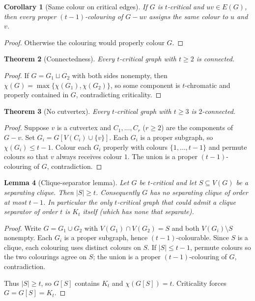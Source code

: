 \documentclass[11pt]{article}
\newtheorem{theorem}{Theorem}[section]
\newtheorem{lemma}[theorem]{Lemma}
\newtheorem{corollary}[theorem]{Corollary}
\theoremstyle{definition}
\begin{document}
\begin{corollary}[Same colour on critical edges]\label{cor:same-col}
If \(G\) is \(t\)-critical and \(uv\in E(G)\), then every proper
\((t-1)\)-colouring of \(G-uv\) assigns the same colour to \(u\) and \(v\).
\end{corollary}

\begin{proof}
Otherwise the colouring would properly colour \(G\).
\end{proof}

\begin{theorem}[Connectedness]\label{thm:conn}
Every \(t\)-critical graph with \(t\ge 2\) is connected.
\end{theorem}

\begin{proof}
If \(G=G_1\sqcup G_2\) with both sides nonempty, then
\(\chi(G)=\max\{\chi(G_1),\chi(G_2)\}\), so some component is \(t\)-chromatic and
properly contained in \(G\), contradicting criticality.
\end{proof}

\begin{theorem}[No cutvertex]\label{thm:2conn}
Every \(t\)-critical graph with \(t\ge 3\) is \(2\)-connected.
\end{theorem}

\begin{proof}
Suppose \(v\) is a cutvertex and \(C_1,\dots,C_r\) (\(r\ge 2\)) are the
components of \(G-v\). Set \(G_i=G[V(C_i)\cup\{v\}]\). Each \(G_i\) is a proper
subgraph, so \(\chi(G_i)\le t-1\). Colour each \(G_i\) properly with colours
\(\{1,\dots,t-1\}\) and permute colours so that \(v\) always receives colour
\(1\). The union is a proper \((t-1)\)-colouring of \(G\), contradiction.
\end{proof}

\begin{lemma}[Clique-separator lemma]\label{lem:clique-sep}
Let \(G\) be \(t\)-critical and let \(S\subseteq V(G)\) be a separating clique.
Then \(|S|\ge t\). Consequently \(G\) has no separating clique of order at most
\(t-1\). In particular the only \(t\)-critical graph that could admit a clique
separator of order \(t\) is \(K_t\) itself (which has none that separate).
\end{lemma}

\begin{proof}
Write \(G=G_1\cup G_2\) with \(V(G_1)\cap V(G_2)=S\) and both
\(V(G_i)\setminus S\) nonempty. Each \(G_i\) is a proper subgraph, hence
\((t-1)\)-colourable. Since \(S\) is a clique, each colouring uses distinct
colours on \(S\). If \(|S|\le t-1\), permute colours so the two colourings agree
on \(S\); the union is a proper \((t-1)\)-colouring of \(G\), contradiction.

Thus \(|S|\ge t\), so \(G[S]\) contains \(K_t\) and \(\chi(G[S])=t\). Criticality
forces \(G=G[S]=K_t\).
\end{proof}
\end{document}
